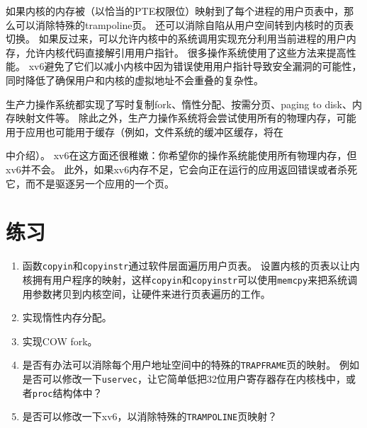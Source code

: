 如果内核的内存被（以恰当的PTE权限位）映射到了每个进程的用户页表中，那么可以消除特殊的trampoline页。
还可以消除自陷从用户空间转到内核时的页表切换。
如果反过来，可以允许内核中的系统调用实现充分利用当前进程的用户内存，允许内核代码直接解引用用户指针。
很多操作系统使用了这些方法来提高性能。
xv6避免了它们以减小内核中因为错误使用用户指针导致安全漏洞的可能性，同时降低了确保用户和内核的虚拟地址不会重叠的复杂性。

生产力操作系统都实现了写时复制fork、惰性分配、按需分页、paging to disk、内存映射文件等。
除此之外，生产力操作系统将会尝试使用所有的物理内存，可能用于应用也可能用于缓存（例如，文件系统的缓冲区缓存，将在\author{s8-2}中介绍）。
xv6在这方面还很稚嫩：你希望你的操作系统能使用所有物理内存，但xv6并不会。
此外，如果xv6内存不足，它会向正在运行的应用返回错误或者杀死它，而不是驱逐另一个应用的一个页。

\section{练习}
\begin{enumerate}
    \item 函数\texttt{copyin}和\texttt{copyinstr}通过软件层面遍历用户页表。
    设置内核的页表以让内核拥有用户程序的映射，这样\texttt{copyin}和\texttt{copyinstr}可以使用\texttt{memcpy}来把系统调用参数拷贝到内核空间，让硬件来进行页表遍历的工作。
    \item 实现惰性内存分配。
    \item 实现COW fork。
    \item 是否有办法可以消除每个用户地址空间中的特殊的\texttt{TRAPFRAME}页的映射。
    例如是否可以修改一下\texttt{uservec}，让它简单低把32位用户寄存器存在内核栈中，或者\texttt{proc}结构体中？
    \item 是否可以修改一下xv6，以消除特殊的\texttt{TRAMPOLINE}页映射？
\end{enumerate}
